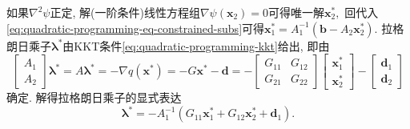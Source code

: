 \documentclass{SBCbookchapter}
\newcommand{\V}[1]{{\bm{#1}}}
\numberwithin{equation}{section}
\begin{document}
如果$\nabla^2 \psi$正定, 解(一阶条件)线性方程组$\nabla \psi (\V{x}_2) = 0$可得唯一解$\V{x}_2^*,$ 回代入\eqref{eq:quadratic-programming-eq-constrained-subs}可得$\V{x}_1^* = A_1^{-1} ( \V{b} - A_2 \V{x}_2^* ).$ 拉格朗日乘子$\V{\lambda}^*$由KKT条件\eqref{eq:quadratic-programming-kkt}给出, 即由
\begin{equation}
\label{eq:quadratic-programming-eq-lambda}
\begin{bmatrix} A_1 \\ A_2 \end{bmatrix} \V{\lambda}^* = A \V{\lambda}^* = -\nabla q(\V{x}^*) = - G \V{x}^* - \V{d} = - \begin{bmatrix} G_{11} & G_{12} \\ G_{21} & G_{22} \end{bmatrix} \begin{bmatrix} \V{x}_1^* \\ \V{x}_2^* \end{bmatrix} - \begin{bmatrix} \V{d}_1 \\ \V{d}_2 \end{bmatrix}
\end{equation}
确定. 解得拉格朗日乘子的显式表达
\begin{equation*}
\V{\lambda}^* = -A_1^{-1} \left( G_{11} \V{x}_1^* + G_{12} \V{x}_2^* + \V{d}_1 \right).
\end{equation*}
\end{document}
